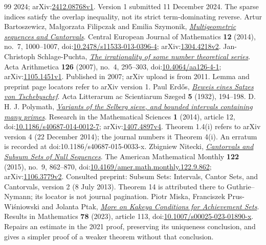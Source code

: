 \documentclass[11pt]{article}
\begin{document}
\begin{thebibliography}{99}
  2024; arXiv:\href{https://arxiv.org/abs/2412.08768v1}{2412.08768v1}. Version 1 submitted 11 December 2024. The sparse indices satisfy the overlap inequality, not its strict term-dominating reverse.
 Artur Bartoszewicz, Ma{\l}gorzata Filipczak and Emilia Szymonik, \href{https://arxiv.org/abs/1304.4218v2}{\emph{Multigeometric sequences and Cantorvals}}.
  Central European Journal of Mathematics \textbf{12} (2014), no.~7, 1000--1007, doi:\href{https://doi.org/10.2478/s11533-013-0396-4}{10.2478/s11533-013-0396-4}; arXiv:\href{https://arxiv.org/abs/1304.4218v2}{1304.4218v2}.
 Jan-Christoph Schlage-Puchta, \href{https://arxiv.org/abs/1105.1451v1}{\emph{The irrationality of some number theoretical series}}.
  Acta Arithmetica \textbf{126} (2007), no.~4, 295--303, doi:\href{https://doi.org/10.4064/aa126-4-1}{10.4064/aa126-4-1}; arXiv:\href{https://arxiv.org/abs/1105.1451v1}{1105.1451v1}. Published in 2007; arXiv upload is from 2011. Lemma and preprint page locators refer to arXiv version 1.
 Paul Erd\H{o}s, \href{https://users.renyi.hu/~p_erdos/1932-01.pdf}{\emph{Beweis eines Satzes von Tschebyschef}}.
  Acta Litterarum ac Scientiarum Szeged \textbf{5} (1932), 194--198.
 {D. H. J. Polymath}, \href{https://arxiv.org/abs/1407.4897v4}{\emph{Variants of the Selberg sieve, and bounded intervals containing many primes}}.
  Research in the Mathematical Sciences \textbf{1} (2014), article 12, doi:\href{https://doi.org/10.1186/s40687-014-0012-7}{10.1186/s40687-014-0012-7}; arXiv:\href{https://arxiv.org/abs/1407.4897v4}{1407.4897v4}. Theorem 1.4(i) refers to arXiv version 4 (22 December 2014); the journal numbers it Theorem 4(i). An erratum is recorded at doi:10.1186/s40687-015-0033-x.
 Zbigniew Nitecki, \href{https://arxiv.org/abs/1106.3779v2}{\emph{Cantorvals and Subsum Sets of Null Sequences}}.
  The American Mathematical Monthly \textbf{122} (2015), no.~9, 862--870, doi:\href{https://doi.org/10.4169/amer.math.monthly.122.9.862}{10.4169/amer.math.monthly.122.9.862}; arXiv:\href{https://arxiv.org/abs/1106.3779v2}{1106.3779v2}. Consulted preprint: Subsum Sets: Intervals, Cantor Sets, and Cantorvals, version 2 (8 July 2013). Theorem 14 is attributed there to Guthrie--Nymann; its locator is not journal pagination.
 Piotr Miska, Franciszek Prus-Wi\'sniowski and Jolanta Ptak, \href{https://ruj.uj.edu.pl/server/api/core/bitstreams/d6630f7b-e6ee-4de8-8a1b-81c7b4c59d2e/content}{\emph{More on Kakeya Conditions for Achievement Sets}}.
  Results in Mathematics \textbf{78} (2023), article 113, doi:\href{https://doi.org/10.1007/s00025-023-01890-x}{10.1007/s00025-023-01890-x}. Repairs an estimate in the 2021 proof, preserving its uniqueness conclusion, and gives a simpler proof of a weaker theorem without that conclusion.

\end{thebibliography}
\end{document}
